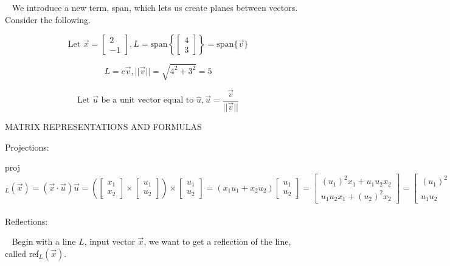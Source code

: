 \documentclass[12pt]{article}
\begin{document}
$\,\,\,$ We introduce a new term, span, which lets us create planes between vectors. Consider the following.

$$\text{Let }\vec{x}=\begin{bmatrix}2\\-1\end{bmatrix},L=\text{span}\left\lbrace\begin{bmatrix}4\\3\end{bmatrix}\right\rbrace=\text{span}\lbrace \vec{v}\rbrace$$

$$L=c\vec{v},||\vec{v}||=\sqrt{4^2+3^2}=5$$

$$\text{Let }\vec{u} \text{ be a unit vector equal to }\hat{u},\vec{u}=\frac{\vec{v}}{||\vec{v}||}$$

\newpage
\begin{center}
MATRIX REPRESENTATIONS AND FORMULAS
\end{center}

Projections:

proj$_L(\vec{x})=(\vec{x}\cdot\vec{u})\vec{u}=\left(\begin{bmatrix}x_1\\x_2\end{bmatrix}\times\begin{bmatrix}u_1\\u_2\end{bmatrix}\right)\times\begin{bmatrix}u_1\\u_2\end{bmatrix}=(x_1u_1+x_2u_2)\begin{bmatrix}u_1\\u_2\end{bmatrix}=\begin{bmatrix}(u_1)^2x_1+u_1u_2x_2\\u_1u_2x_1+(u_2)^2x_2\end{bmatrix}=\begin{bmatrix}(u_1)^2 & u_1u_2\\u_1u_2 & (u_2)^2\end{bmatrix}\begin{bmatrix}x_1\\x_2\end{bmatrix}$\\\\

Reflections:

$\,\,\,$ Begin with a line $L$, input vector $\vec{x}$, we want to get a reflection of the line, called ref$_L(\vec{x})$.
\end{document}
